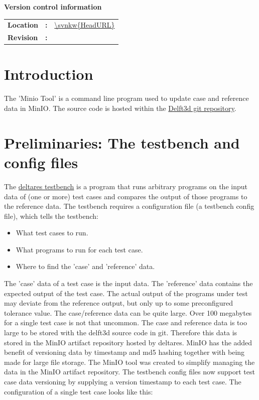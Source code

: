 \documentclass{deltares_memo}
\begin{document}
\memoConfidentialUntil{}
\memoDate {\today}
\memoTelephone{}
\memoCopy{---}

\deltarestitle

{{\footnotesize
		{\textbf{Version control information}}
		
		\begin{tabular}{@{}p{}@{}p{0mm}p{\textwidth-27mm-24pt}}
			\textbf{Location} & \textbf{:} & \url{\svnkw{HeadURL}} \\
			\textbf{Revision} & \textbf{:} & \svnrev 
		\end{tabular}
}}

\tableofcontents

\newpage
\section{Introduction}
The 'Minio Tool' is a command line program used to update case and reference data in MinIO. The source code is hosted within the \href{https://github.com/Deltares/Delft3D/tree/main/test/deltares_testbench/tools/minio}{Delft3d git repository}.

\section{Preliminaries: The testbench and config files}
The \href{https://github.com/Deltares/Delft3D/tree/main/test/deltares_testbench}{deltares testbench} is a program that runs arbitrary programs on the input data of (one or more) test cases and compares the output of those programs to the reference data. The testbench requires a configuration file (a testbench config file), which tells the testbench: 
\newline
\begin{itemize}
	\item What test cases to run. 
	\item What programs to run for each test case.
	\item Where to find the 'case' and 'reference' data.
\end{itemize}

The 'case' data of a test case is the input data. The 'reference' data contains the expected output of the test case. The actual output of the programs under test may deviate from the reference output, but only up to some preconfigured tolerance value. The case/reference data can be quite large. Over 100 megabytes for a single test case is not that uncommon. The case and reference data is too large to be stored with the delft3d source code in git. Therefore this data is stored in the MinIO artifact repository hosted by deltares. MinIO has the added benefit of versioning data by timestamp and md5 hashing together with being made for large file storage. The MinIO tool was created to simplify managing the data in the MinIO artifact repository. The testbench config files now support test case data versioning by supplying a version timestamp to each test case. The configuration of a single test case looks like this:
\end{document}
